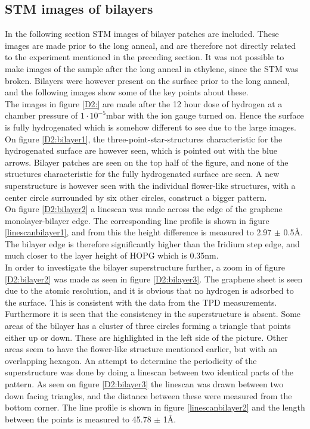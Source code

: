 \subsection{STM images of bilayers}

In the following section STM images of bilayer patches are included. These images are made prior to the long anneal, and are therefore not directly related to the experiment mentioned in the preceding section. It was not possible to make images of the sample after the long anneal in ethylene, since the STM was broken. Bilayers were however present on the surface prior to the long anneal, and the following images show some of the key points about these.\\
The images in figure \ref{D2:} are made after the 12 hour dose of hydrogen at a chamber pressure of $1\cdot 10^{-5}$mbar with the ion gauge turned on. Hence the surface is fully hydrogenated which is somehow different to see due to the large images. On figure \ref{D2:bilayer1}, the three-point-star-structures characteristic for the hydrogenated surface are however seen, which is pointed out with the blue arrows. Bilayer patches are seen on the top half of the figure, and none of the structures characteristic for the fully hydrogenated surface are seen. A new superstructure is however seen with the individual flower-like structures, with a center circle surrounded by six other circles, construct a bigger pattern.\\
On figure \ref{D2:bilayer2} a linescan was made across the edge of the graphene monolayer-bilayer edge. The corresponding line profile is shown in figure \ref{linescanbilayer1}, and from this the height difference is measured to 2.97 $\pm$ 0.5Å. The bilayer edge is therefore significantly higher than the Iridium step edge, and much closer to the layer height of HOPG which is 0.35nm.\cite{PhysRevB.79.195429}\\
In order to investigate the bilayer superstructure further, a zoom in of figure \ref{D2:bilayer2} was made as seen in figure \ref{D2:bilayer3}. The graphene sheet is seen due to the atomic resolution, and it is obvious that no hydrogen is adsorbed to the surface. This is consistent with the data from the TPD measurements. Furthermore it is seen that the consistency in the superstructure is absent. Some areas of the bilayer has a cluster of three circles forming a triangle that points either up or down. These are highlighted in the left side of the picture. Other areas seem to have the flower-like structure mentioned earlier, but with an overlapping hexagon. An attempt to determine the periodicity of the superstructure was done by doing a linescan between two identical parts of the pattern. As seen on figure \ref{D2:bilayer3} the linescan was drawn between two down facing triangles, and the distance between these were measured from the bottom corner. The line profile is shown in figure \ref{linescanbilayer2} and the length between the points is measured to 45.78 $\pm$ 1Å.

